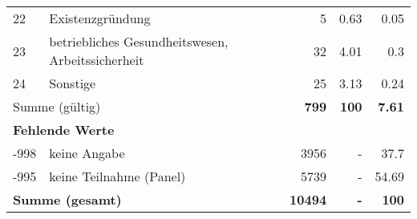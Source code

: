 \begin{longtable}{lXrrr}
        22 & \multicolumn{1}{X}{Existenzgründung} & %
          \num{5} &
          \num[round-mode=places,round-precision=2]{0.63} &
          \num[round-mode=places,round-precision=2]{0.05} \\

        23 & \multicolumn{1}{X}{betriebliches Gesundheitswesen, Arbeitssicherheit} & %
          \num{32} &
          \num[round-mode=places,round-precision=2]{4.01} &
          \num[round-mode=places,round-precision=2]{0.3} \\

        24 & \multicolumn{1}{X}{Sonstige} & %
          \num{25} &
          \num[round-mode=places,round-precision=2]{3.13} &
          \num[round-mode=places,round-precision=2]{0.24} \\

     \midrule
     \multicolumn{2}{l}{Summe (gültig)} &
       \textbf{\num{799}} &
     \textbf{\num{100}} &
       \textbf{\num[round-mode=places,round-precision=2]{7.61}} \\
     \multicolumn{5}{l}{\textbf{Fehlende Werte}}\\
       -998 &
       keine Angabe &
         \num{3956} &
        - &
         \num[round-mode=places,round-precision=2]{37.7} \\
       -995 &
       keine Teilnahme (Panel) &
         \num{5739} &
        - &
         \num[round-mode=places,round-precision=2]{54.69} \\
     \midrule
     \multicolumn{2}{l}{\textbf{Summe (gesamt)}} &
          \textbf{\num{10494}} &
        \textbf{-} &
        \textbf{\num{100}} \\
     \bottomrule
     \end{longtable}
     
